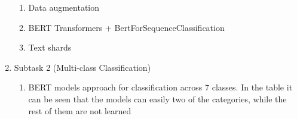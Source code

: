 \documentclass[11pt]{article}
\begin{document}
\begin{enumerate}
\begin{enumerate}
		      \item Data augmentation


		      \item BERT Transformers + BertForSequenceClassification


		      \item Text shards

	      \end{enumerate}

	\item Subtask 2 (Multi-class Classification)

	      \begin{enumerate}
		      \item BERT models approach for classification across 7 classes. In the table it
		            can be seen that the models can easily two of the categories,
		            while the rest of them are not learned


\end{enumerate}
\end{enumerate}
\end{document}
